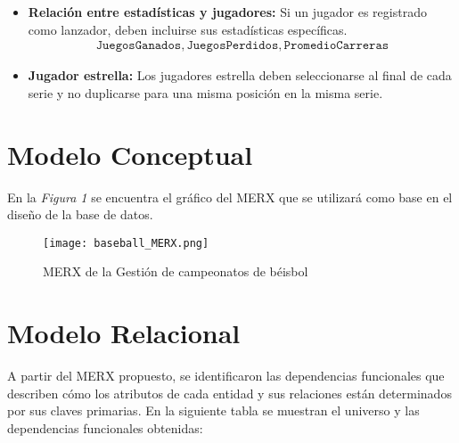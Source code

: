 \documentclass{report}
\begin{document}
\begin{itemize}
        \item \textbf{Relación entre estadísticas y jugadores:} Si un jugador es registrado como lanzador, deben incluirse sus estadísticas específicas.
        \begin{align*}
            \texttt{JuegosGanados}, \texttt{JuegosPerdidos}, \texttt{PromedioCarreras}
        \end{align*}

        \item \textbf{Jugador estrella:} Los jugadores estrella deben seleccionarse al final de cada serie y no 
        duplicarse para una misma posición en la misma serie.
    \end{itemize}

    \newpage

    \section*{Modelo Conceptual}

    En la \textit{Figura 1} se encuentra el gráfico del MERX que se utilizará como base en el diseño de la base de 
    datos.

    \begin{figure}[H] 
        \centering
        \texttt{[image: baseball\_MERX.png]}
        \caption{MERX de la Gestión de campeonatos de béisbol}
    \end{figure}

    \newpage

    \section*{Modelo Relacional}

    A partir del MERX propuesto, se identificaron las dependencias funcionales que describen cómo los atributos de cada entidad y sus relaciones están determinados por sus claves primarias.
    En la siguiente tabla se muestran el universo y las dependencias funcionales obtenidas: \newline
    
\end{document}
